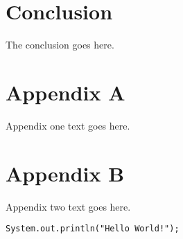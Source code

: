 \documentclass[12pt,journal,compsoc]{IEEEtran}
\begin{document}
\section{Conclusion}
The conclusion goes here.





\appendices
\section*{Appendix A}

Appendix one text goes here.

\section*{Appendix B}
Appendix two text goes here.

\begin{lstlisting}[label=code:hello_world, caption={Hello World Code Snippet}]
System.out.println("Hello World!");
\end{lstlisting}

\ifCLASSOPTIONcaptionsoff
  \newpage
\fi





\end{document}
